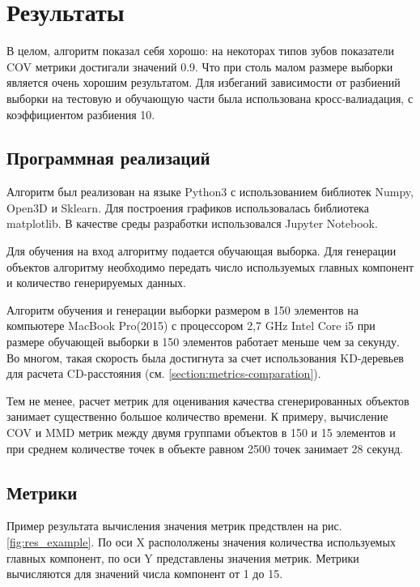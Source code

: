 \section{Результаты} \label{section:results}

В целом, алгоритм показал себя хорошо: на некоторах типов зубов показатели COV метрики достигали значений 0.9. Что при столь малом размере выборки является очень хорошим результатом. Для избеганий зависимости от разбиений выборки на тестовую и обучающую части была использована кросс-валиадация, с коэффициентом разбиения 10.

\subsection{Программная реализаций}

Алгоритм был реализован на языке Python3 с использованием библиотек Numpy, Open3D и Sklearn. Для построения графиков использовалась библиотека matplotlib. В качестве среды разработки использовался Jupyter Notebook. \par
Для обучения на вход алгоритму подается обучающая выборка. Для генерации объектов алгоритму необходимо передать число используемых главных компонент и количество генерируемых данных. \par
Алгоритм обучения и генерации выборки размером в 150 элементов на компьютере MacBook Pro(2015) с процессором 2,7 GHz Intel Core i5 при размере обучающей выборки в 150 элементов работает меньше чем за секунду. Во многом, такая скорость была достигнута за счет использования KD-деревьев для расчета CD-расстояния (см. \ref{section:metrics-comparation}). \par
Тем не менее, расчет метрик для оценивания качества сгенерированных объектов занимает существенно большое количество времени. К примеру, вычисление COV и MMD метрик между двумя группами объектов в 150 и 15 элементов и при среднем количестве точек в объекте равном 2500 точек занимает 28 секунд. 


\subsection{Метрики}

Пример результата вычисления значения метрик предствлен на рис. \ref{fig:res_example}. По оси X распололжены значения количества используемых главных компонент, по оси Y представлены значения метрик. Метрики вычисляются для значений числа компонент от 1 до 15.

